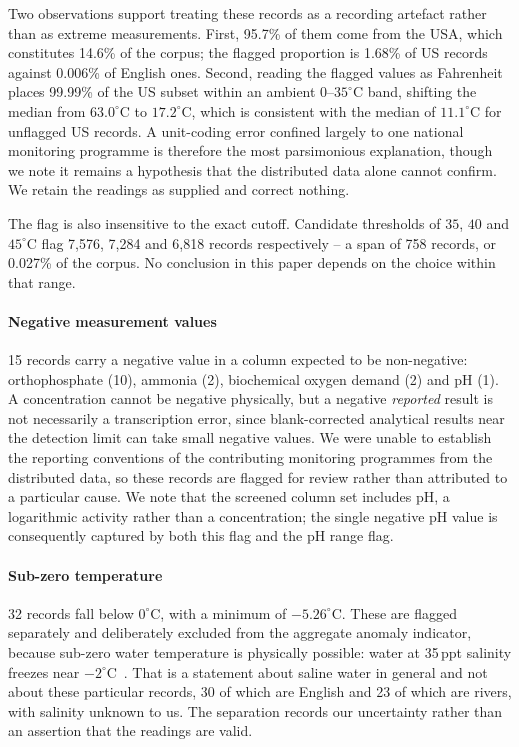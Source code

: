 Two observations support treating these records as a recording artefact rather than as
extreme measurements. First, 95.7\% of them come from the USA, which constitutes 14.6\% of
the corpus; the flagged proportion is 1.68\% of US records against 0.006\% of English
ones. Second, reading the flagged values as Fahrenheit places 99.99\% of the US subset
within an ambient $0$--$35^\circ$C band, shifting the median from $63.0^\circ$C to
$17.2^\circ$C, which is consistent with the median of $11.1^\circ$C for unflagged US
records. A unit-coding error confined largely to one national monitoring programme is
therefore the most parsimonious explanation, though we note it remains a hypothesis that
the distributed data alone cannot confirm. We retain the readings as supplied and
correct nothing.

The flag is also insensitive to the exact cutoff. Candidate thresholds of $35$, $40$ and
$45^\circ$C flag 7{,}576, 7{,}284 and 6{,}818 records respectively -- a span of 758 records,
or 0.027\% of the corpus. No conclusion in this paper depends on the choice within that
range.

\paragraph{Negative measurement values}
15 records carry a negative value in a column expected to be non-negative: orthophosphate
(10), ammonia (2), biochemical oxygen demand (2) and pH (1). A concentration cannot be
negative physically, but a negative \emph{reported} result is not necessarily a
transcription error, since blank-corrected analytical results near the detection limit can
take small negative values. We were unable to establish the reporting conventions of the
contributing monitoring programmes from the distributed data, so these records are flagged
for review rather than attributed to a particular cause. We note that the screened column
set includes pH, a logarithmic activity rather than a concentration; the single negative
pH value is consequently captured by both this flag and the pH range flag.

\paragraph{Sub-zero temperature}
32 records fall below $0^\circ$C, with a minimum of $-5.26^\circ$C. These are flagged
separately and deliberately excluded from the aggregate anomaly indicator, because
sub-zero water temperature is physically possible: water at 35\,ppt salinity freezes near
$-2^\circ$C~\cite{noaa_seawater}. That is a statement about saline water in general and
not about these particular records, 30 of which are English and 23 of which are rivers,
with salinity unknown to us. The separation records our uncertainty rather than an
assertion that the readings are valid.

